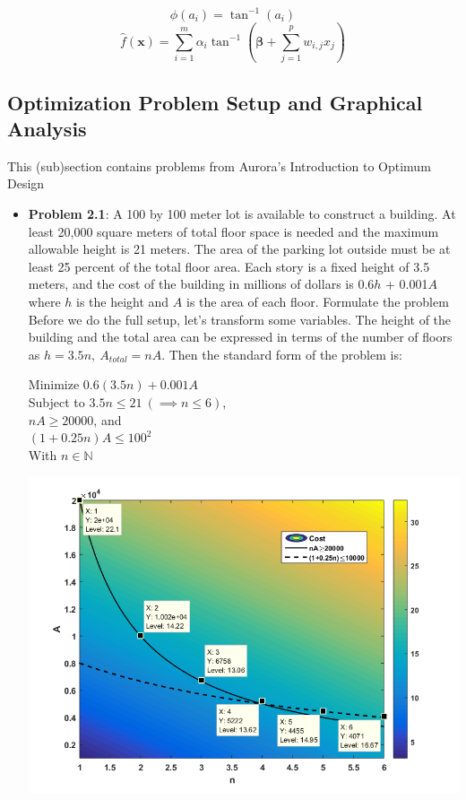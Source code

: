 \documentclass[11pt]{article}
\newcommand{\Item}[1]{\item \textbf{#1}:}
\newcommand{\sumlim}[2]{\sum\limits_{#1}^{#2}}
\newcommand{\boldx}{\mathbf{x}}
\newcommand{\Problem}[1]{\Item{Problem #1}}
\begin{document}
$$\phi(a_i)=\tan^{-1}(a_i)$$
$$\hat{f}(\boldx) = \sumlim{i=1}{m}\alpha_i\tan^{-1}\left(\bm{\beta} + \sumlim{j=1}{p}w_{i,j}x_j\right)$$

\subsection{Optimization Problem Setup and Graphical Analysis}
This (sub)section contains problems from Aurora's Introduction to Optimum Design
\begin{itemize}
\Problem{2.1}
A 100 by 100 meter lot is available to construct a building. At least 20,000 square meters of total floor space is needed and the maximum allowable height is 21 meters. The area of the parking lot outside must be at least 25 percent of the total floor area. Each story is a fixed height of 3.5 meters, and the cost of the building in millions of dollars is 0.6$h$ + 0.001$A$ where $h$ is the height and $A$ is the area of each floor. Formulate the problem\\

Before we do the full setup, let's transform some variables. The height of the building and the total area can be expressed in terms of the number of floors as $h = 3.5n,\ A_{total} = nA$. Then the standard form of the problem is:

\begin{minipage}{0.45\textwidth}
	\begin{center}
		Minimize $0.6(3.5n) + 0.001A$ \\
		Subject to $3.5n\leq21\ (\implies n\leq6)$,\\
		$nA\geq20000$, and \\
		$(1+0.25n)A\leq100^2$\\
		With $n\in\mathbb{N}$
	\end{center}
\end{minipage}
\begin{minipage}{0.53\textwidth}
	\includegraphics[width=\textwidth]{Graphics/aurora_p2-1.png}
\end{minipage}

\end{itemize}
\end{document}
